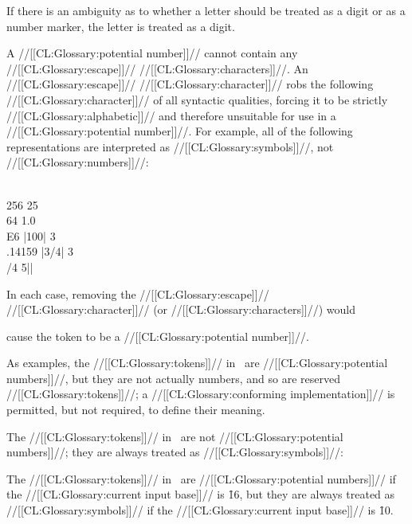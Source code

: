 If there is an ambiguity as to whether a letter should be treated as a digit or as a number marker, the letter is treated as a digit.

 

A //[[CL:Glossary:potential number]]// cannot contain any //[[CL:Glossary:escape]]// //[[CL:Glossary:characters]]//.  An //[[CL:Glossary:escape]]// //[[CL:Glossary:character]]// robs the following //[[CL:Glossary:character]]// of all syntactic qualities, forcing it to be strictly //[[CL:Glossary:alphabetic]]// and therefore unsuitable for use in a //[[CL:Glossary:potential number]]//.  For example, all of the following representations are interpreted as //[[CL:Glossary:symbols]]//, not //[[CL:Glossary:numbers]]//:

\code
 \\256   25\\64   1.0\\E6   |100|   3\\.14159   |3/4|   3\\/4   5|| \endcode

In each case, removing the //[[CL:Glossary:escape]]// //[[CL:Glossary:character]]// (or //[[CL:Glossary:characters]]//)  would 

cause the token to be a //[[CL:Glossary:potential number]]//.

\endsubsubsubsection%


As examples, the //[[CL:Glossary:tokens]]// in \thenextfigure\ are //[[CL:Glossary:potential numbers]]//, but they are not actually numbers, and so are reserved //[[CL:Glossary:tokens]]//; a //[[CL:Glossary:conforming implementation]]// is permitted, but not required, to define their meaning.


The //[[CL:Glossary:tokens]]// in \thenextfigure\ are not //[[CL:Glossary:potential numbers]]//;  they are always treated as //[[CL:Glossary:symbols]]//:

                                   The //[[CL:Glossary:tokens]]// in \thenextfigure\ are //[[CL:Glossary:potential numbers]]// if the //[[CL:Glossary:current input base]]// is \f{16},  but they are always treated as //[[CL:Glossary:symbols]]// if the //[[CL:Glossary:current input base]]// is \f{10}. 

